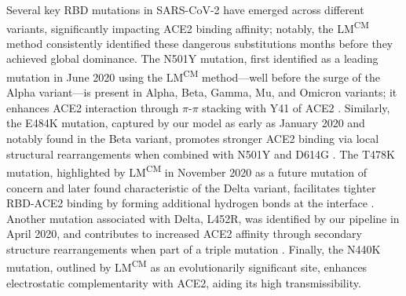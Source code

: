 \documentclass[%
 reprint,
superscriptaddress,
 amsmath,amssymb,
 aps,
]{revtex4-2}
\begin{document}
Several key RBD mutations in SARS-CoV-2 have emerged across different variants, significantly impacting ACE2 binding affinity; notably, the LM\textsuperscript{CM} method consistently identified these dangerous substitutions months before they achieved global dominance. The N501Y mutation, first identified as a leading mutation in June 2020 using the LM\textsuperscript{CM} method—well before the surge of the Alpha variant—is present in Alpha, Beta, Gamma, Mu, and Omicron variants; it enhances ACE2 interaction through $\pi$-$\pi$ stacking with Y41 of ACE2 \cite{Dejnirattisai2021}. Similarly, the E484K mutation, captured by our model as early as January 2020 and notably found in the Beta variant, promotes stronger ACE2 binding via local structural rearrangements when combined with N501Y and D614G \cite{Mannar2021}. The T478K mutation, highlighted by LM\textsuperscript{CM} in November 2020 as a future mutation of concern and later found characteristic of the Delta variant, facilitates tighter RBD-ACE2 binding by forming additional hydrogen bonds at the interface \cite{10.1038/s41467-022-28528-w}. Another mutation associated with Delta, L452R, was identified by our pipeline in April 2020, and contributes to increased ACE2 affinity through secondary structure rearrangements when part of a triple mutation \cite{10.1039/D1CP04005G}. Finally, the N440K mutation, outlined by LM\textsuperscript{CM} as an evolutionarily significant site, enhances electrostatic complementarity with ACE2, aiding its high transmissibility.
\end{document}
